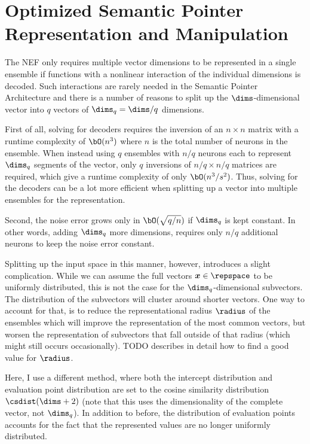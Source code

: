 \section{Optimized Semantic Pointer Representation and Manipulation}
The NEF only requires multiple vector dimensions to be represented in a single ensemble if functions with a nonlinear interaction of the individual dimensions is decoded.
Such interactions are rarely needed in the Semantic Pointer Architecture and there is a number of reasons to split up the $\dims$-dimensional vector into $q$ vectors of $\dims_q = \dims / q$ dimensions.

First of all, solving for decoders requires the inversion of an $n \times n$ matrix with a runtime complexity of $\bO(n^3)$ where $n$ is the total number of neurons in the ensemble.
When instead using $q$ ensembles with $n/q$ neurons each to represent $\dims_q$ segments of the vector, only $q$ inversions of $n/q \times n/q$ matrices are required, which give a runtime complexity of only $\bO(n^3/s^2)$.
Thus, solving for the decoders can be a lot more efficient when splitting up a vector into multiple ensembles for the representation.

Second, the noise error grows only in $\bO(\sqrt{q/n})$ if $\dims_q$ is kept constant.
In other words, adding $\dims_q$ more dimensions, requires only $n/q$ additional neurons to keep the noise error constant.

Splitting up the input space in this manner, however, introduces a slight complication.
While we can assume the full vectors $\vc x \in \repspace$ to be uniformly distributed, this is not the case for the $\dims_q$-dimensional subvectors.
The distribution of the subvectors will cluster around shorter vectors.
One way to account for that, is to reduce the representational radius $\radius$ of the ensembles which will improve the representation of the most common vectors, but worsen the representation of subvectors that fall outside of that radius (which might still occurs occasionally).
TODO describes in detail how to find a good value for $\radius$.

Here, I use a different method, where both the intercept distribution and evaluation point distribution are set to the cosine similarity distribution $\csdist(\dims + 2)$ (note that this uses the dimensionality of the complete vector, not $\dims_q$).
In addition to before, the distribution of evaluation points accounts for the fact that the represented values are no longer uniformly distributed.

